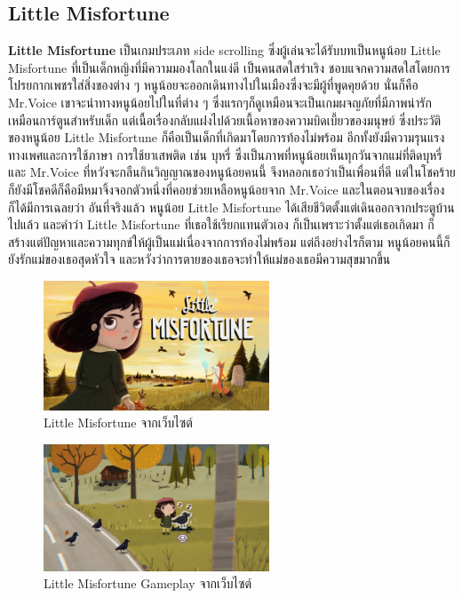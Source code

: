 \subsection{Little Misfortune}
\subsubitem \textbf{Little Misfortune}  เป็นเกมประเภท side scrolling ซึ่งผู้เล่นจะได้รับบทเป็นหนูน้อย Little Misfortune ที่เป็นเด็กหญิงที่มีความมองโลกในแง่ดี เป็นคนสดใสร่าเริง ชอบแจกความสดใสโดยการโปรยกากเพชรใส่สิ่งของต่าง ๆ หนูน้อยจะออกเดินทางไปในเมืองซึ่งจะมีผู้ที่พูดคุยด้วย นั่นก็คือ Mr.Voice เขาจะนำทางหนูน้อยไปในที่ต่าง ๆ ซึ่งแรกๆก็ดูเหมือนจะเป็นเกมผจญภัยที่มีภาพน่ารักเหมือนการ์ตูนสำหรับเด็ก แต่เนื้อเรื่องกลับแฝงไปด้วยเนื้อหาของความบิดเบี้ยวของมนุษย์ ซึ่งประวัติของหนูน้อย Little Misfortune ก็คือเป็นเด็กที่เกิดมาโดยการท้องไม่พร้อม อีกทั้งยังมีความรุนแรงทางเพศและการใช้ภาษา การใช้ยาเสพติด เช่น บุหรี่ ซึ่งเป็นภาพที่หนูน้อยเห็นทุกวันจากแม่ที่ติดบุหรี่ และ Mr.Voice ที่หวังจะกลืนกินวิญญาณของหนูน้อยคนนี้ จึงหลอกเธอว่าเป็นเพื่อนที่ดี แต่ในโชคร้ายก็ยังมีโชคดีก็คือมีหมาจิ้งจอกตัวหนึ่งที่คอยช่วยเหลือหนูน้อยจาก Mr.Voice และในตอนจบของเรื่องก็ได้มีการเฉลยว่า อันที่จริงแล้ว หนูน้อย Little Misfortune ได้เสียชีวิตตั้งแต่เดินออกจากประตูบ้านไปแล้ว และคำว่า Little Misfortune ที่เธอใช้เรียกแทนตัวเอง ก็เป็นเพราะว่าตั้งแต่เธอเกิดมา ก็สร้างแต่ปัญหาและความทุกข์ให้ผู้เป็นแม่เนื่องจากการท้องไม่พร้อม แต่ถึงอย่างไรก็ตาม หนูน้อยคนนี้ก็ยังรักแม่ของเธอสุดหัวใจ และหวังว่าการตายของเธอจะทำให้แม่ของเธอมีความสุขมากขึ้น
\begin{figure}[h]
  \centering
  \includegraphics[width=0.6\textwidth, height=0.2\textheight]{Images/little_misfortune.jpg}
  \caption{Little Misfortune จากเว็บไซต์}\label{little_misfurtune}
\end{figure}

\begin{figure}[h]
  \centering
  \includegraphics[width=0.6\textwidth, height=0.2\textheight]{Images/662px-Little_misfortune_sparkle_05.jpg}
  \caption{Little Misfortune Gameplay จากเว็บไซต์}\label{littleMisfortune1}
\end{figure}


